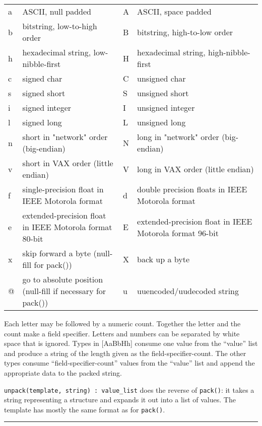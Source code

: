 \begin{flushleft}
\begin{xtabular}{|m{0.12in}|m{2.69in}|m{0.12in}|m{2.69in}|}
\hline
a & ASCII, null padded & A & ASCII, space padded\\
b & bitstring, low-to-high order & B & bitstring, high-to-low order\\
h & hexadecimal string, low-nibble-first &
H & hexadecimal string, high-nibble-first\\
c & signed char & C & unsigned char\\
s & signed short & S & unsigned short\\
i & signed integer & I & unsigned integer\\
l & signed long & L & unsigned long\\
n & short in "network" order
(big-endian) &
N & long in "network" order
(big-endian)\\
v & short in VAX order (little endian) &
V & long in VAX order (little endian)\\
f & single-precision float in IEEE Motorola format &
d & double precision floats in IEEE Motorola format\\
e & extended-precision float in IEEE Motorola format 80-bit &
E & extended-precision float in IEEE Motorola format 96-bit\\
x & skip forward a byte (null-fill for pack()) &
X & back up a byte\\
@ & go to absolute position (null-fill if necessary for
pack()) &
u & uuencoded/uudecoded string \\
\hline
\end{xtabular}
\end{flushleft}

\noindent
Each letter may be followed by a numeric count.
Together the letter and the count make a field specifier. Letters and
numbers can be separated by white space that is ignored. Types in 
[AaBbHh] consume one value from the
``value'' list and produce a string of the
length given as the field-specifier-count. The other types consume
``field-specifier-count'' values from the
``value'' list and append the appropriate
data to the packed string.

\texttt{unpack(template, string) : value\_list} does the reverse of
\texttt{pack()}: it takes a string representing a structure and expands
it out into a list of values. The template has mostly the same format
as for \texttt{pack()}.

\vspace{0.25cm}\hrule{}

